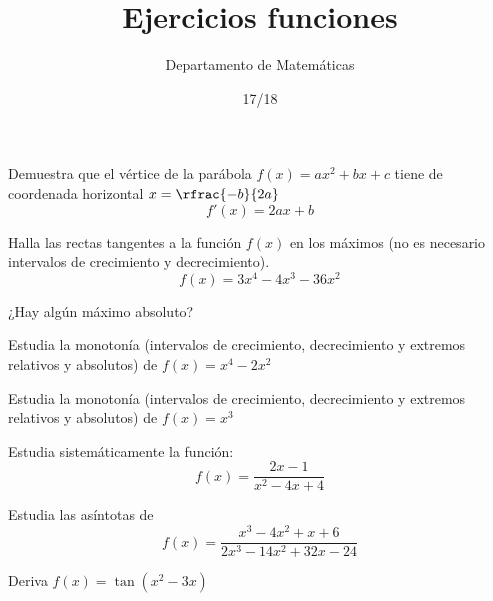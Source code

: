 \documentclass[palatino,nosec]{Docencia}
\title{Ejercicios funciones}
\author{Departamento de Matemáticas}
\date{17/18}
\begin{document}
\pagestyle{plain}

	
\begin{problem} Demuestra que el vértice de la parábola $f(x) = ax^2+bx+c$ tiene de coordenada horizontal $x=\rfrac{-b}{2a}$
\solution
\[
	f'(x) = 2ax+b
\]
\end{problem}


\begin{problem} Halla las rectas tangentes a la función $f(x)$ en los máximos (no es necesario intervalos de crecimiento y decrecimiento).
\[
f(x) = 3x^4-4x^3-36x^2
\]

¿Hay algún máximo absoluto?

\solution

\end{problem}

\begin{problem} Estudia la monotonía (intervalos de crecimiento, decrecimiento y extremos relativos y absolutos) de $f(x) = x^4-2x^2$
\solution
\end{problem}

\begin{problem} Estudia la monotonía (intervalos de crecimiento, decrecimiento y extremos relativos y absolutos) de $f(x) = x^3$
\solution
\end{problem}

\begin{problem} Estudia sistemáticamente la función: \[f(x) = \frac{2x-1}{x^2-4x+4}\]

\solution
\end{problem}

\begin{problem} Estudia las asíntotas de \[f(x) =\frac{x^3-4x^2+x+6}{2x^3-14x^2+32x-24}\]
\solution
\end{problem}

\begin{problem} Deriva $f(x) = \tan(x^2-3x)$
\solution
\end{problem}
\end{document}
